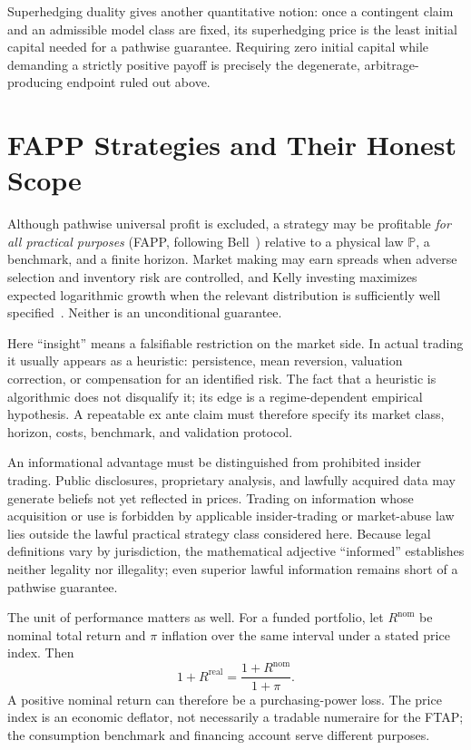 \documentclass[aps,pra,reprint,superscriptaddress,amsmath,amssymb,floatfix]{revtex4-2}
\theoremstyle{plain}
\theoremstyle{definition}
\theoremstyle{remark}
\begin{document}
Superhedging duality gives another quantitative notion: once a contingent
claim and an admissible model class are fixed, its superhedging price is the
least initial capital needed for a pathwise guarantee. Requiring zero initial
capital while demanding a strictly positive payoff is precisely the
degenerate, arbitrage-producing endpoint ruled out above.

\section{FAPP Strategies and Their Honest Scope}
\label{sec:fapp}

Although pathwise universal profit is excluded, a strategy may be profitable
\emph{for all practical purposes} (FAPP, following Bell~\cite{bell-a}) relative
to a physical law \(\mathbb P\), a benchmark, and a finite horizon. Market
making may earn spreads when adverse selection and inventory risk are
controlled, and Kelly investing maximizes expected logarithmic growth when the
relevant distribution is sufficiently well specified~\cite{Kelly1956}. Neither
is an unconditional guarantee.

Here ``insight'' means a falsifiable restriction on the market side. In actual
trading it usually appears as a heuristic: persistence, mean reversion,
valuation correction, or compensation for an identified risk. The fact that a
heuristic is algorithmic does not disqualify it; its edge is a regime-dependent
empirical hypothesis. A repeatable ex ante claim must therefore specify its
market class, horizon, costs, benchmark, and validation protocol.

An informational advantage must be distinguished from prohibited insider
trading. Public disclosures, proprietary analysis, and lawfully acquired data
may generate beliefs not yet reflected in prices. Trading on information whose
acquisition or use is forbidden by applicable insider-trading or market-abuse
law lies outside the lawful practical strategy class considered here. Because
legal definitions vary by jurisdiction, the mathematical adjective
``informed'' establishes neither legality nor illegality; even superior lawful
information remains short of a pathwise guarantee.

The unit of performance matters as well. For a funded portfolio, let
\(R^{\mathrm{nom}}\) be nominal total return and \(\pi\) inflation over the same
interval under a stated price index. Then
\begin{equation}
  1+R^{\mathrm{real}}
  =\frac{1+R^{\mathrm{nom}}}{1+\pi}.
  \label{eq:real-return}
\end{equation}
A positive nominal return can therefore be a purchasing-power loss. The price
index is an economic deflator, not necessarily a tradable numeraire for the
FTAP; the consumption benchmark and financing account serve different
purposes.
\end{document}
